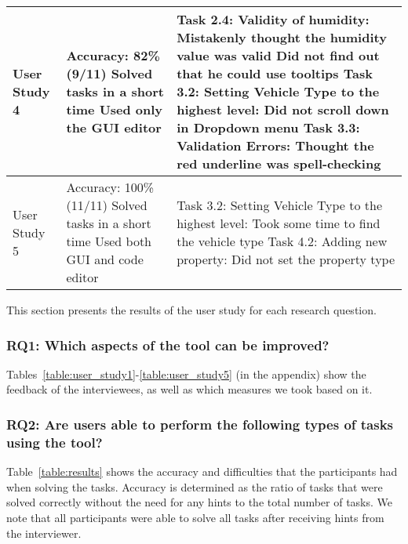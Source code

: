 \begin{table*}[!hbt]
\begin{tabular}{lp{4.5cm}p{6cm}}
        User Study 4 &
        Accuracy: 82\%(9/11)\newline
        Solved tasks in a short time\newline
        Used only the GUI editor

        &

        Task 2.4: Validity of humidity:\newline
        Mistakenly thought the humidity value was valid\newline
        Did not find out that he could use tooltips\newline
        Task 3.2: Setting Vehicle Type to the highest level: \newline
        Did not scroll down in Dropdown menu\newline
        Task 3.3: Validation Errors:\newline
        Thought the red underline was spell-checking \\ \midrule

        User Study 5 &
        Accuracy: 100\%(11/11)\newline
        Solved tasks in a short time\newline
        Used both GUI and code editor

        &

        Task 3.2: Setting Vehicle Type to the highest level: \newline
        Took some time to find the vehicle type \newline
        Task 4.2: Adding new property:\newline
        Did not set the property type \\ \bottomrule
    \end{tabular}
\end{table*}
This section presents the results of the user study for each research question.

\subsubsection{\textbf{RQ1:} Which aspects of the tool can be improved?}\label{subsubsec:rq1} %
Tables~\ref{table:user_study1}-\ref{table:user_study5} (in the appendix) show the feedback of the interviewees, as well as which measures we took based on it.


\subsubsection{\textbf{RQ2:} Are users able to perform the following types of tasks using the tool?}
Table~\ref{table:results} shows the accuracy and difficulties that the participants had when solving the tasks.
Accuracy is determined as the ratio of tasks that were solved correctly without the need for any hints to the total number of tasks.
We note that all participants were able to solve all tasks after receiving hints from the interviewer.


